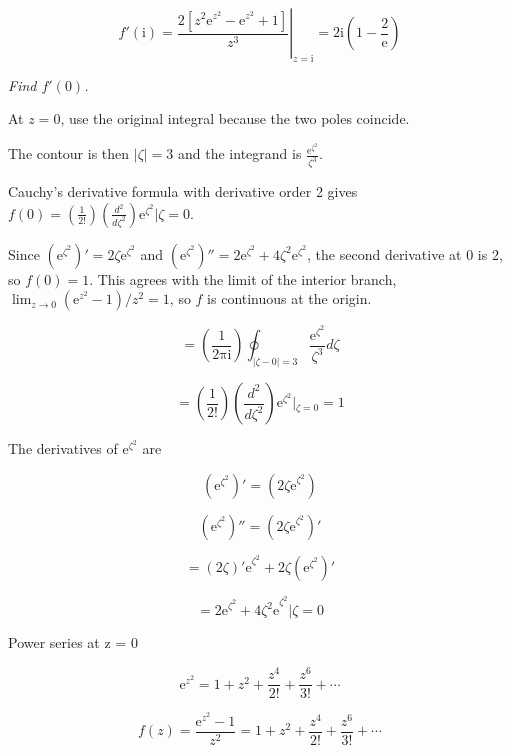\documentclass[11pt,a4paper]{article}
\theoremstyle{definition}
\theoremstyle{plain}
\begin{document}
\begin{equation}
f'(\mathrm{i}) = {\left.\frac{2[z^{2}\mathrm{e}^{z^{2}} - \mathrm{e}^{z^{2}} + 1]}{z^{3}}\right\vert{}}_{z = \mathrm{i}} = 2\mathrm{i}\left(1 - \frac{2}{\mathrm{e}}\right)
\end{equation}

\textit{Find $f'(0)$.}

At $z = 0$, use the original integral because the two poles coincide.

The contour is then $\vert{}\zeta\vert{} = 3$ and the integrand is $\frac{\mathrm{e}^{\zeta^{2}}}{\zeta^{3}}$.

Cauchy’s derivative formula with derivative order 2 gives $f(0) = \left(\frac{1}{2!}\right)\left(\frac{d^{2}}{d\zeta^{2}}\right)\mathrm{e}^{\zeta^{2}}\vert{}\zeta = 0$.

Since $(\mathrm{e}^{\zeta^{2}})'= 2\zeta \mathrm{e}^{\zeta^{2}}$ and $(\mathrm{e}^{\zeta^{2}})''= 2\mathrm{e}^{\zeta^{2}} + 4\zeta^{2}\mathrm{e}^{\zeta^{2}}$, the second derivative at 0 is 2, so $f(0) = 1$. This agrees with the limit of the interior branch, $\lim_{z \to 0}(\mathrm{e}^{z^{2}} - 1)/z^{2} = 1$, so $f$ is continuous at the origin.

\[
= \left(\frac{1}{2\mathrm{\pi}\mathrm{i}}\right)\oint_{\vert{}\zeta - 0\vert{} = 3}\frac{\mathrm{e}^{\zeta^{2}}}{\zeta^{3}}d\zeta
\]

\[
= \left(\frac{1}{2!}\right)\left(\frac{d^{2}}{d\zeta^{2}}\right)\mathrm{e}^{\zeta^{2}}\vert{}_{\zeta = 0} = 1
\]

The derivatives of $\mathrm{e}^{\zeta^{2}}$ are

\begin{equation}
(\mathrm{e}^{\zeta^{2}})'= ({2\zeta \mathrm{e}}^{\zeta^{2}})
\end{equation}

\[
(\mathrm{e}^{\zeta^{2}})''= ({2\zeta \mathrm{e}}^{\zeta^{2}})'
\]

\[
= (2\zeta){'\mathrm{e}}^{\zeta^{2}} + 2\zeta(\mathrm{e}^{\zeta^{2}})'
\]

\[
= {2\mathrm{e}}^{\zeta^{2}} + {4\zeta^{2}\mathrm{e}}^{\zeta^{2}} \vert{}\zeta = 0
\]

Power series at z = 0

\begin{equation}
\mathrm{e}^{z^{2}} = 1 + z^{2} + \frac{z^{4}}{2!} + \frac{z^{6}}{3!} + \cdots
\end{equation}

\[
f(z) = \frac{\mathrm{e}^{z^{2}} - 1}{z^{2}} = 1 + z^{2} + \frac{z^{4}}{2!} + \frac{z^{6}}{3!} + \cdots
\]
\end{document}

